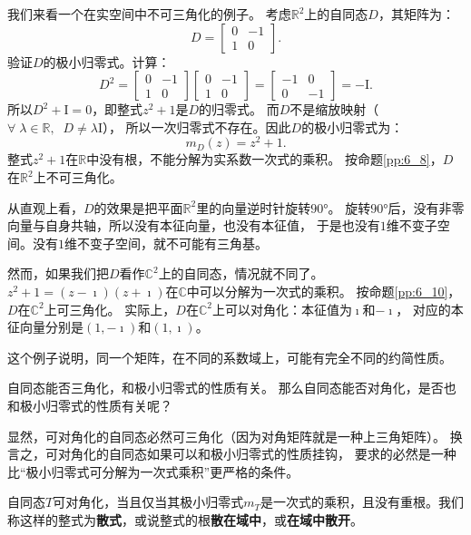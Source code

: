 \documentclass[12pt,UTF8]{ctexbook}
\begin{document}
我们来看一个在实空间中不可三角化的例子。
考虑$\mathbb{R}^2$上的自同态$D$，其矩阵为：
$$
D = \begin{bmatrix} 0 & -1 \\ 1 & 0 \end{bmatrix}.
$$
验证$D$的极小归零式。计算：
$$
D^2 = \begin{bmatrix} 0 & -1 \\ 1 & 0 \end{bmatrix}\begin{bmatrix} 0 & -1 \\ 1 & 0 \end{bmatrix} = \begin{bmatrix} -1 & 0 \\ 0 & -1 \end{bmatrix} = -\mathrm{I}.
$$
所以$D^2 + \mathrm{I} = 0$，即整式$z^2 + 1$是$D$的归零式。
而$D$不是缩放映射（$\forall\;\lambda \in \mathbb{R},\;\;D \neq \lambda \mathrm{I}$），
所以一次归零式不存在。因此$D$的极小归零式为：
$$
m_D(z) = z^2 + 1.
$$
整式$z^2 + 1$在$\mathbb{R}$中没有根，不能分解为实系数一次式的乘积。
按命题\ref{pp:6_8}，$D$在$\mathbb{R}^2$上不可三角化。

从直观上看，$D$的效果是把平面$\mathbb{R}^2$里的向量逆时针旋转$90°$。
旋转$90°$后，没有非零向量与自身共轴，所以没有本征向量，也没有本征值，
于是也没有$1$维不变子空间。没有$1$维不变子空间，就不可能有三角基。

然而，如果我们把$D$看作$\mathbb{C}^2$上的自同态，情况就不同了。
$z^2 + 1 = (z - \imath)(z + \imath)$在$\mathbb{C}$中可以分解为一次式的乘积。
按命题\ref{pp:6_10}，$D$在$\mathbb{C}^2$上可三角化。
实际上，$D$在$\mathbb{C}^2$上可以对角化：本征值为$\imath$和$-\imath$，
对应的本征向量分别是$(1, -\imath)$和$(1, \imath)$。

这个例子说明，同一个矩阵，在不同的系数域上，可能有完全不同的约简性质。

自同态能否三角化，和极小归零式的性质有关。
那么自同态能否对角化，是否也和极小归零式的性质有关呢？

显然，可对角化的自同态必然可三角化（因为对角矩阵就是一种上三角矩阵）。
换言之，可对角化的自同态如果可以和极小归零式的性质挂钩，
要求的必然是一种比“极小归零式可分解为一次式乘积”更严格的条件。

\begin{pp}\label{pp:6_11}
    自同态$T$可对角化，当且仅当其极小归零式$m_T$是一次式的乘积，且没有重根。我们称这样的整式为\textbf{散式}，或说整式的根\textbf{散在域中}，或\textbf{在域中散开}。
\end{pp}
\end{document}
